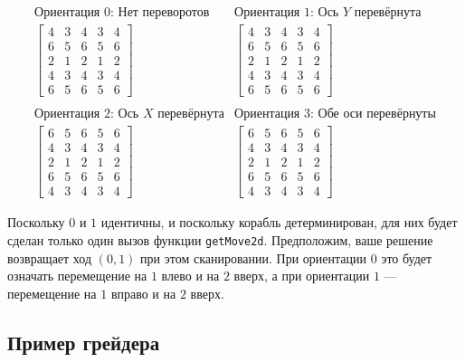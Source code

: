 \documentclass[12pt]{article}
\begin{document}
\[
\begin{array}{cc}
\text{Ориентация $0$: Нет переворотов} & \text{Ориентация $1$: Ось $Y$ перевёрнута} \\
\left[
\begin{array}{ccccc}
4 & 3 & 4 & 3 & 4 \\
6 & 5 & 6 & 5 & 6 \\
2 & 1 & 2 & 1 & 2 \\
4 & 3 & 4 & 3 & 4 \\
6 & 5 & 6 & 5 & 6
\end{array}
\right]
&
\left[
\begin{array}{ccccc}
4 & 3 & 4 & 3 & 4 \\
6 & 5 & 6 & 5 & 6 \\
2 & 1 & 2 & 1 & 2 \\
4 & 3 & 4 & 3 & 4 \\
6 & 5 & 6 & 5 & 6
\end{array}
\right]
\\
\\
\text{Ориентация $2$: Ось $X$ перевёрнута} & \text{Ориентация $3$: Обе оси перевёрнуты} \\
\left[
\begin{array}{ccccc}
6 & 5 & 6 & 5 & 6 \\
4 & 3 & 4 & 3 & 4 \\
2 & 1 & 2 & 1 & 2 \\
6 & 5 & 6 & 5 & 6 \\
4 & 3 & 4 & 3 & 4
\end{array}
\right]
&
\left[
\begin{array}{ccccc}
6 & 5 & 6 & 5 & 6 \\
4 & 3 & 4 & 3 & 4 \\
2 & 1 & 2 & 1 & 2 \\
6 & 5 & 6 & 5 & 6 \\
4 & 3 & 4 & 3 & 4
\end{array}
\right]
\end{array}
\] 

Поскольку $0$ и $1$ идентичны, и поскольку корабль детерминирован, для них будет сделан только один вызов функции \verb|getMove2d|. Предположим, ваше решение возвращает ход $(0, 1)$ при этом сканировании. При ориентации $0$ это будет означать перемещение на $1$ влево и на $2$ вверх, а при ориентации $1$ — перемещение на $1$ вправо и на $2$ вверх.

\subsection{Пример грейдера}
\end{document}

